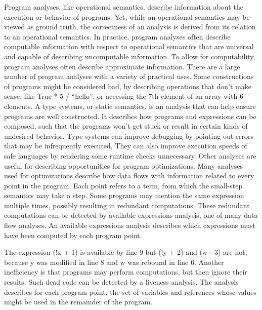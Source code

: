 \documentclass{article}
\begin{document}
	Program analyses, like operational semantics, describe information about the execution or behavior of programs.  Yet, while an operational semantics may be viewed as ground truth, the correctness of an analysis is derived from its relation to an operational semantics.  In practice, program analyses often describe computable information with respect to operational semantics that are universal and capable of describing uncomputable information.  To allow for computability, program analyses often describe approximate information.
	There are a large number of program analyses with a variety of practical uses.  Some constructions of programs might be considered bad, by describing operations that don't make sense, like True * 5 / “hello”, or accessing the 7th element of an array with 6 elements.  A type systems, or static semantics, is an analysis that can help ensure programs are well constructed.  It describes how programs and expressions can be composed, such that the programs won't get stuck or result in certain kinds of undesired behavior.  Type systems can improve debugging by pointing out errors that may be infrequently executed.  They can also improve execution speeds of safe languages by rendering some runtime checks unnecessary.  
	Other analyses are useful for describing opportunities for program optimizations.  Many analyses used for optimizations describe how data flows with information related to every point in the program.  Each point refers to a term, from which the small-step semantics may take a step.  Some programs may mention the same expression multiple times, possibly resulting in redundant computations.  These redundant computations can be detected by available expressions analysis, one of many data flow analyses.  An available expressions analysis describes which expressions must have been computed by each program point.


  The expression (!x + 1) is available by line 9 but (!y + 2) and (w - 3) are not, because y was modified in line 8 and w was rebound in line 6.  
	Another inefficiency is that programs may perform computations, but then ignore their results.  Such dead code can be detected by a liveness analysis.  The analysis describes for each program point, the set of variables and references whose values might be used in the remainder of the program.
\end{document}
